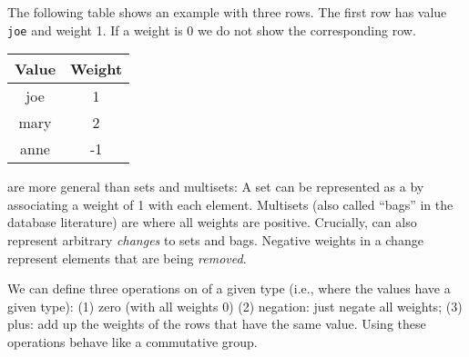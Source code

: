 The following table shows an example \zr with three rows.  The first
row has value \texttt{joe} and weight 1.  If a weight is 0 we do not
show the corresponding row.

\begin{center}
\begin{tabular}{|c|c|}\hline
  Value & Weight \\ \hline
  joe & 1 \\
  mary & 2 \\
  anne & -1 \\ \hline
\end{tabular}
\end{center}


\zrs are more general than sets and multisets: A set can be
represented as a \zr by associating a weight of 1 with each element.
Multisets (also called ``bags'' in the database literature) are \zrs
where all weights are positive.  Crucially, \zrs can also represent
arbitrary \emph{changes} to sets and bags.  Negative weights in a
change represent elements that are being \emph{removed}.

We can define three operations on \zr of a given type (i.e., where
the values have a given type): (1) zero (with all weights 0) (2)
negation: just negate all weights; (3) plus: add up the weights of the
rows that have the same value.  Using these operations \zrs behave
like a commutative group.



